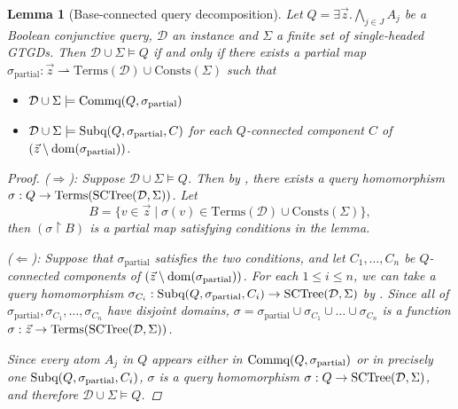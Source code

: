 \documentclass[12pt]{report}
\theoremstyle{plain}
\newtheorem{lemma}[theorem]{Lemma}
\theoremstyle{definition}
\def\Consts{{\mathrm{Consts}}}
\def\Terms{{\mathrm{Terms}}}
\newcommand{\dom}[1]{\ensuremath{\normalfont{\operatorname{dom}}\!\left( #1 \right)}}
\newcommand{\SCTree}[2]{\ensuremath{\normalfont{\textrm{SCTree}}\!\left( #1, #2 \right)}}
\newcommand{\Subq}[3]{\ensuremath{\normalfont{\textrm{Subq}}\!\left( #1, #2, #3 \right)}}
\newcommand{\Commq}[2]{\ensuremath{\normalfont{\textrm{Commq}}\!\left( #1, #2 \right)}}
\begin{document}
\begin{lemma}[Base-connected query decomposition]
\label{lemma:bcq-base-connected-query-decomposition}
  Let $Q = \exists \vec{z}. \bigwedge_{j \in J} A_j$ be a Boolean conjunctive query, $\mathcal{D}$ an instance and $\Sigma$ a finite set of single-headed GTGDs. Then $\mathcal{D} \cup \Sigma \models Q$ if and only if there exists a partial map $\sigma_{\mathrm{partial}}: \vec{z} \rightharpoonup \Terms(\mathcal{D}) \cup \Consts(\Sigma)$ such that
  \begin{itemize}
    \item $\mathcal{D} \cup \Sigma \models \Commq{Q}{\sigma_{\mathrm{partial}}}$
    \item $\mathcal{D} \cup \Sigma \models \Subq{Q}{\sigma_{\mathrm{partial}}}{C}$ for each $Q$-connected component $C$ of \newline $(\vec{z} \setminus\nobreak \mathrm{\dom{\sigma_{\mathrm{partial}}}})$.
  \end{itemize}
  \begin{proof}
    ($\Longrightarrow$): Suppose $\mathcal{D} \cup \Sigma \models Q$. Then by , there exists a query homomorphism $\sigma: Q \rightarrow \Terms(\SCTree{\mathcal{D}}{\Sigma})$. Let $$B = \{ v \in \vec{z} \mid \sigma(v) \in \Terms(\mathcal{D}) \cup \Consts(\Sigma) \},$$ then $(\sigma \upharpoonright B)$ is a partial map satisfying conditions in the lemma.

    ($\Longleftarrow$): Suppose that $\sigma_{\mathrm{partial}}$ satisfies the two conditions, and let $C_1, \ldots, C_n$ be $Q$-connected components of $(\vec{z} \setminus\nobreak \mathrm{\dom{\sigma_{\mathrm{partial}}}})$. For each $1 \leq i \leq n$, we can take a query homomorphism $\sigma_{C_i}: \Subq{Q}{\sigma_{\mathrm{partial}}}{C_i} \rightarrow \SCTree{\mathcal{D}}{\Sigma}$ by . Since all of $\sigma_{\mathrm{partial}}, \sigma_{C_1}, \ldots, \sigma_{C_n}$ have disjoint domains, $\sigma = \sigma_{\mathrm{partial}} \cup \sigma_{C_1} \cup \ldots \cup \sigma_{C_n}$ is a function $\sigma: \vec{z} \rightarrow \Terms(\SCTree{\mathcal{D}}{\Sigma})$.
    
    Since every atom $A_j$ in $Q$ appears either in $\Commq{Q}{\sigma_{\mathrm{partial}}}$ or in precisely one $\Subq{Q}{\sigma_{\mathrm{partial}}}{C_i}$, $\sigma$ is a query homomorphism $\sigma: Q \rightarrow \SCTree{\mathcal{D}}{\Sigma}$, and therefore $\mathcal{D} \cup \Sigma \models Q$.
  \end{proof}
\end{lemma}
\end{document}
